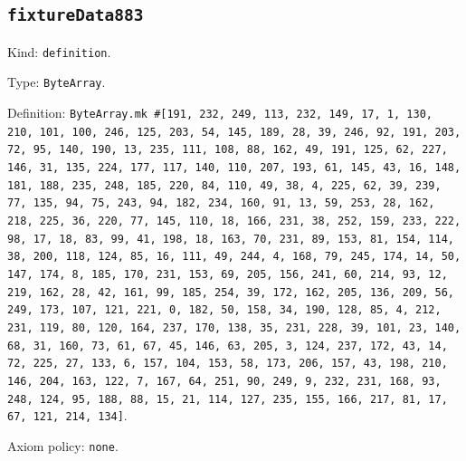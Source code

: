 \documentclass[11pt]{article}
\begin{document}
\subsection*{\texttt{fixtureData883}}
\noindent Kind: \texttt{definition}.\par
\noindent Type: \texttt{ByteArray}.\par
\noindent Definition: \texttt{ByteArray.mk \#[191, 232, 249, 113, 232, 149, 17, 1, 130, 210, 101, 100, 246, 125, 203, 54, 145, 189, 28, 39, 246, 92, 191, 203, 72, 95, 140, 190, 13, 235, 111, 108, 88, 162, 49, 191, 125, 62, 227, 146, 31, 135, 224, 177, 117, 140, 110, 207, 193, 61, 145, 43, 16, 148, 181, 188, 235, 248, 185, 220, 84, 110, 49, 38, 4, 225, 62, 39, 239, 77, 135, 94, 75, 243, 94, 182, 234, 160, 91, 13, 59, 253, 28, 162, 218, 225, 36, 220, 77, 145, 110, 18, 166, 231, 38, 252, 159, 233, 222, 98, 17, 18, 83, 99, 41, 198, 18, 163, 70, 231, 89, 153, 81, 154, 114, 38, 200, 118, 124, 85, 16, 111, 49, 244, 4, 168, 79, 245, 174, 14, 50, 147, 174, 8, 185, 170, 231, 153, 69, 205, 156, 241, 60, 214, 93, 12, 219, 162, 28, 42, 161, 99, 185, 254, 39, 172, 162, 205, 136, 209, 56, 249, 173, 107, 121, 221, 0, 182, 50, 158, 34, 190, 128, 85, 4, 212, 231, 119, 80, 120, 164, 237, 170, 138, 35, 231, 228, 39, 101, 23, 140, 68, 31, 160, 73, 61, 67, 45, 146, 63, 205, 3, 124, 237, 172, 43, 14, 72, 225, 27, 133, 6, 157, 104, 153, 58, 173, 206, 157, 43, 198, 210, 146, 204, 163, 122, 7, 167, 64, 251, 90, 249, 9, 232, 231, 168, 93, 248, 124, 95, 188, 88, 15, 21, 114, 127, 235, 155, 166, 217, 81, 17, 67, 121, 214, 134]}.\par
\noindent Axiom policy: \texttt{none}.\par
\end{document}
